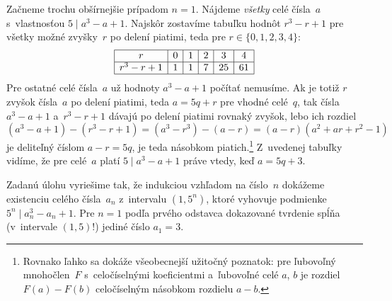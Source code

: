 {%
Začneme trochu obšírnejšie prípadom $n=1$.
Nájdeme {\it všetky\/} celé čísla~$a$ s~vlastnosťou $5\mid a^3-a+1$.
Najskôr zostavíme tabuľku
hodnôt $r^3-r+1$ pre všetky možné zvyšky~$r$ po delení piatimi,
teda pre $r\in\{0,1,2,3,4\}$:
$$
\vbox{\everycr{\noalign{\hrule}}\offinterlineskip\let\\=\cr
\halign{\strut\vrule#&&\enspace\hss$#$\enspace \hss\vrule\cr
&r&0&1&2&3&4\\
&r^3-r+1&1&1&7&25&61\cr
}}
$$
Pre ostatné celé čísla~$a$ už hodnoty $a^3-a+1$ počítať nemusíme.
Ak je totiž $r$ zvyšok čísla~$a$ po delení piatimi, teda
$a=5q+r$ pre vhodné celé~$q$, tak čísla $a^3-a+1$ a~$r^3-r+1$
dávajú po delení piatimi rovnaký zvyšok, lebo ich rozdiel
$$
(a^3-a+1)-(r^3-r+1)=(a^3-r^3)-(a-r)=(a-r)(a^2+ar+r^2-1)
$$
je deliteľný číslom $a-r=5q$, je teda násobkom
piatich.\footnote{Rovnako ľahko sa dokáže všeobecnejší užitočný poznatok:
pre ľubovoľný mnohočlen~$F$
s~celočíselnými koeficientmi a~ľubovoľné celé $a$, $b$ je
rozdiel $F(a)-F(b)$ celočíselným násobkom rozdielu $a-b$.} Z~uvedenej
tabuľky vidíme, že pre celé~$a$ platí $5\mid a^3-a+1$ práve vtedy, keď
$a=5q+3$.

Zadanú úlohu vyriešime tak, že indukciou
vzhľadom na číslo~$n$ dokážeme existenciu
celého čísla~$a_n$ z~intervalu $(1,5^n)$,
ktoré vyhovuje podmienke $5^n\mid a_n^3-a_n+1$.
Pre $n=1$ podľa prvého odstavca
dokazované tvrdenie spĺňa (v~intervale $(1,5)$!)
jediné číslo $a_1=3$.

}
